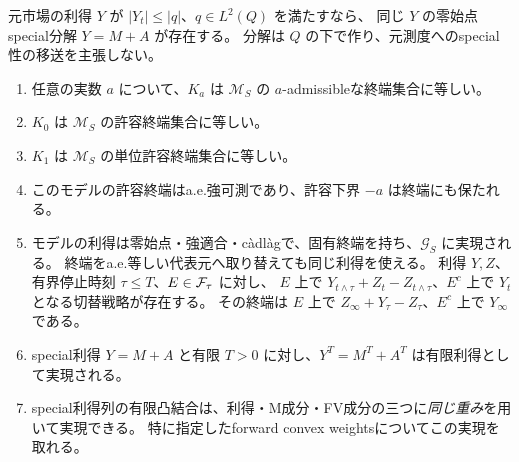 \begin{proposition}[指定された利得のspecial分解]\label{input:decomposition}
元市場の利得 $Y$ が $|Y_t|\leq|q|$、$q\in L^2(Q)$ を満たすなら、
同じ $Y$ の零始点special分解 $Y=M+A$ が存在する。
分解は $Q$ の下で作り、元測度へのspecial性の移送を主張しない。
\end{proposition}

\begin{proposition}[市場の同定と有限操作]\label{input:market}
\leavevmode\par
\begin{enumerate}
\item {}
任意の実数 $a$ について、$K_a$ は $\mathcal M_S$ の $a$-admissibleな終端集合に等しい。
\item {}
$K_0$ は $\mathcal M_S$ の許容終端集合に等しい。
\item {}
$K_1$ は $\mathcal M_S$ の単位許容終端集合に等しい。
\item {}
このモデルの許容終端はa.e.強可測であり、許容下界 $-a$ は終端にも保たれる。
\item {}
モデルの利得は零始点・強適合・càdlàgで、固有終端を持ち、$\mathcal G_S$ に実現される。
終端をa.e.等しい代表元へ取り替えても同じ利得を使える。
利得 $Y,Z$、有界停止時刻 $\tau\leq T$、$E\in\mathcal F_\tau$ に対し、
$E$ 上で $Y_{t\wedge\tau}+Z_t-Z_{t\wedge\tau}$、$E^c$ 上で $Y_t$ となる切替戦略が存在する。
その終端は $E$ 上で $Z_\infty+Y_\tau-Z_\tau$、$E^c$ 上で $Y_\infty$ である。
\item {}
special利得 $Y=M+A$ と有限 $T>0$ に対し、$Y^T=M^T+A^T$ は有限利得として実現される。
\item {}
special利得列の有限凸結合は、利得・M成分・FV成分の三つに\emph{同じ重み}を用いて実現できる。
特に指定したforward convex weightsについてこの実現を取れる。
\end{enumerate}
\end{proposition}

